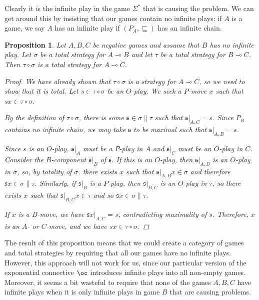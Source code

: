 \documentclass[11pt]{article} %
\theoremstyle{plain} %
\newtheorem{proposition}[theorem]{Proposition}
\theoremstyle{definition} %
\theoremstyle{note}
\theoremstyle{exercisestyle}
\renewcommand{\implies}{\multimap}
\newcommand{\comp}[2]{#1 \circ #2}
\newcommand{\s}{\mathfrak s}
\newcommand{\prefix}{\sqsubseteq}
\newcommand{\st}{{\Sigma^*}}
\begin{document}
Clearly it is the infinite play in the game $\st$ that is causing the problem.  We can get around this by insisting that our games contain no infinite plays: if $A$ is a game, we say $A$ has an infinite play if $(P_A,\prefix)$ has an infinite chain.

\begin{proposition}
  \label{BoundedTotalComposition}
  Let $A,B,C$ be negative games and assume that $B$ has no infinite play.  Let $\sigma$ be a total strategy for $A\implies B$ and let $\tau$ be a total strategy for $B\implies C$.  Then $\comp\tau\sigma$ is a total strategy for $A\implies C$.
  \begin{proof}
    We have already shown that $\comp\tau\sigma$ is a strategy for $A\implies C$, so we need to show that it is total.  Let $s\in\comp\tau\sigma$ be an $O$-play.  We seek a $P$-move $x$ such that $sx\in\comp\tau\sigma$.  

    By the definition of $\comp\tau\sigma$, there is some $\s\in\sigma\|\tau$ such that $\s\vert_{A,C}=s$.  Since $P_B$ contains no infinite chain, we may take $\s$ to be maximal such that $\s\vert_{A,B}=s$.  
    
    Since $s$ is an $O$-play, $\s\vert_A$ must be a $P$-play in $A$ and $\s\vert_C$ must be an $O$-play in $C$.  Consider the $B$-component $\s\vert_B$ of $\s$.  If this is an $O$-play, then $\s\vert_{A,B}$ is an $O$-play in $\sigma$, so, by totality of $\sigma$, there exists $x$ such that $\s\vert_{A,B}x\in\sigma$ and therefore $\s x\in\sigma\|\tau$.  Similarly, if $\s\vert_B$ is a $P$-play, then $\s\vert_{B,C}$ is an $O$-play in $\tau$, so there exists $x$ such that $\s\vert_{B,C}x\in\tau$ and so $\s x\in\sigma\|\tau$.  

    If $x$ is a $B$-move, we have $\s x\vert_{A,C}=s$, contradicting maximality of $s$.  Therefore, $x$ is an $A$- or $C$-move, and we have $sx\in\comp\tau\sigma$.
  \end{proof}
\end{proposition}

The result of this proposition means that we could create a category of games and total strategies by requiring that all our games have no infinite plays.  However, this approach will not work for us, since our particular version of the exponential connective $\oc$ introduces infinite plays into all non-empty games.  Moreover, it seems a bit wasteful to require that none of the games $A,B,C$ have infinite plays when it is only infinite plays in game $B$ that are causing problems.  
\end{document}
